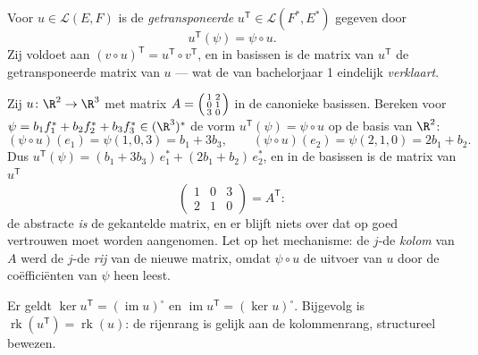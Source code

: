 \begin{definition}\label{def:b2:linalg:transpose}
Voor $u \in \mathcal{L}(E, F)$ is de
\emph{getransponeerde}
$u^{\mathsf T} \in \mathcal{L}(F^*, E^*)$ gegeven door
\[
u^{\mathsf T}(\psi) = \psi \circ u .
\]
Zij voldoet aan $(v \circ u)^{\mathsf T} = u^{\mathsf T} \circ
v^{\mathsf T}$, en in  basissen is de matrix van $u^{\mathsf
T}$ de getransponeerde matrix van $u$ --- wat de  van
bachelorjaar 1 eindelijk \emph{verklaart}.
\end{definition}

\begin{example}\label{ex:b2:linalg:transposework}
Zij $u \colon \R^2 \to \R^3$ met matrix $A =
\begin{psmallmatrix} 1 & 2\\ 0 & 1\\ 3 & 0\end{psmallmatrix}$ in
de canonieke basissen. Bereken voor $\psi = b_1f_1^* + b_2f_2^* +
b_3f_3^* \in (\R^3)^*$ de vorm $u^{\mathsf T}(\psi) = \psi \circ
u$ op de basis van $\R^2$:
\[
(\psi \circ u)(e_1) = \psi(1, 0, 3) = b_1 + 3b_3,
\qquad
(\psi \circ u)(e_2) = \psi(2, 1, 0) = 2b_1 + b_2 .
\]
Dus $u^{\mathsf T}(\psi) = (b_1 + 3b_3)\,e_1^* + (2b_1 +
b_2)\,e_2^*$, en in de  basissen is de matrix van $u^{\mathsf
T}$
\[
\begin{pmatrix} 1 & 0 & 3\\ 2 & 1 & 0\end{pmatrix}
= A^{\mathsf T} :
\]
de abstracte  \emph{is} de gekantelde matrix, en er
blijft niets over dat op goed vertrouwen moet worden aangenomen.
Let op het mechanisme: de $j$-de \emph{kolom} van $A$ werd de
$j$-de \emph{rij} van de nieuwe matrix, omdat $\psi \circ u$ de
uitvoer van $u$ door de coëfficiënten van $\psi$ heen leest.
\end{example}

\begin{proposition}\label{prop:b2:linalg:transposerank}
Er geldt $\ker u^{\mathsf T} = (\operatorname{im} u)^{\circ}$ en
$\operatorname{im} u^{\mathsf T} = (\ker u)^{\circ}$. Bijgevolg is
$\operatorname{rk}(u^{\mathsf T}) = \operatorname{rk}(u)$: de
rijenrang is gelijk aan de kolommenrang, structureel bewezen.
\end{proposition}

